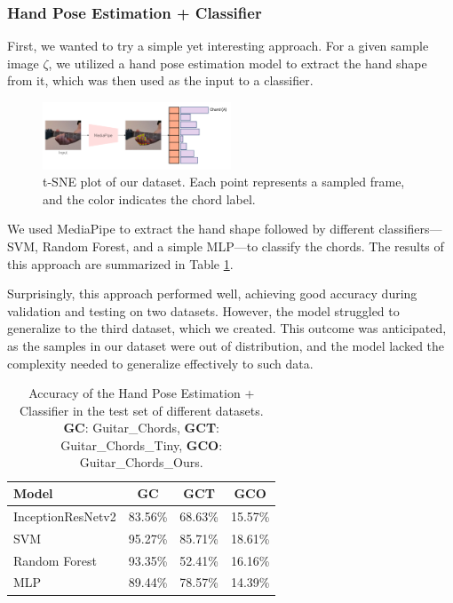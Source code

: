\documentclass[10pt,twocolumn,letterpaper]{article}
\begin{document}
\subsubsection{Hand Pose Estimation + Classifier}
First, we wanted to try a simple yet interesting approach. For a given sample image $\zeta$, we utilized a hand pose estimation model to extract the hand shape from it, which was then used as the input to a classifier.

\begin{figure}[h]
  \centering
  \includegraphics[width=0.5\textwidth]{images/final/hand_pose_estimation_classifier.png}
  \caption{t-SNE plot of our dataset. Each point represents a sampled frame, and the color indicates the chord label. }
  \label{fig:ours-tsne-plot}
\end{figure}

We used MediaPipe to extract the hand shape followed by different classifiers—SVM, Random Forest, and a simple MLP—to classify the chords. The results of this approach are summarized in Table \ref{tab:handpose-classifier-results}.

Surprisingly, this approach performed well, achieving good accuracy during validation and testing on two datasets. However, the model struggled to generalize to the third dataset, which we created. This outcome was anticipated, as the samples in our dataset were out of distribution, and the model lacked the complexity needed to generalize effectively to such data.


\begin{table}[h]
  \centering
  \begin{tabular}{lccc}
    \toprule
    \textbf{Model} & \textbf{GC} & \textbf{GCT} & \textbf{GCO} \\
    \midrule
 InceptionResNetv2 & 83.56\% & 68.63\% & 15.57\% \\
    \midrule
 SVM & 95.27\% & 85.71\% & 18.61\% \\
 Random Forest & 93.35\% & 52.41\% & 16.16\%  \\
 MLP & 89.44\% & 78.57\% & 14.39\% \\
    \bottomrule
  \end{tabular}
  \caption{Accuracy of the Hand Pose Estimation + Classifier in the test set of different datasets. \textbf{GC}: Guitar\_Chords, \textbf{GCT}: Guitar\_Chords\_Tiny, \textbf{GCO}: Guitar\_Chords\_Ours.}
  \label{tab:handpose-classifier-results}
\end{table}
\end{document}
